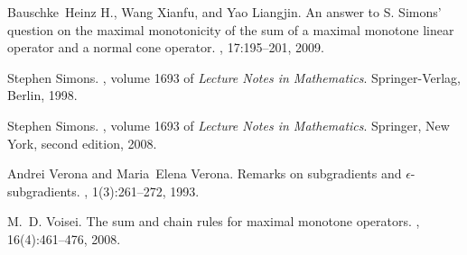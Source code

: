 \documentclass[english]{article}
\begin{document}
\begin{thebibliography}{1}

Bauschke~Heinz H., Wang Xianfu, and Yao Liangjin.
\newblock An answer to {S}. {S}imons' question on the maximal monotonicity of
  the sum of a maximal monotone linear operator and a normal cone operator.
, 17:195--201, 2009.

Stephen Simons.
, volume 1693 of {\em Lecture Notes in
  Mathematics}.
\newblock Springer-Verlag, Berlin, 1998.

Stephen Simons.
, volume 1693 of {\em
  Lecture Notes in Mathematics}.
\newblock Springer, New York, second edition, 2008.

Andrei Verona and Maria~Elena Verona.
\newblock Remarks on subgradients and {$\epsilon$}-subgradients.
, 1(3):261--272, 1993.

M.~D. Voisei.
\newblock The sum and chain rules for maximal monotone operators.
, 16(4):461--476, 2008.

\end{thebibliography}
\end{document}
